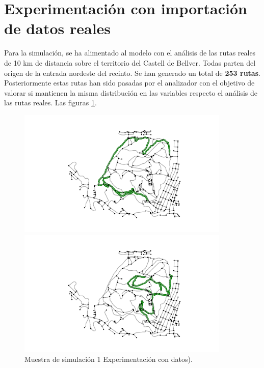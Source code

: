 \section{Experimentación con importación de datos reales}
Para la simulación, se ha alimentado al modelo con el análisis de las rutas reales de 10 
km de distancia sobre el territorio del Castell de Bellver. Todas parten del origen de la 
entrada nordeste del recinto. Se han generado un total de \textbf{253 rutas}. 
Posteriormente estas rutas han sido pasadas por el analizador con el objetivo de valorar 
si mantienen la misma distribución en las variables respecto el análisis de las rutas 
reales. Las figuras \ref{figure:SimulatedTrack1}.
\begin{figure}[!htb]
\centering
\begin{minipage}{0.70\textwidth}
\includegraphics[width=0.9\textwidth]{./Imagenes/SimulatedTrack1.png}
\caption{Muestra de simulación 1 Experimentación con datos).}
\label{figure:SimulatedTrack1}
\end{minipage}
\begin{minipage}{0.48\textwidth}
\includegraphics[width=0.9\textwidth]{./Imagenes/SimulatedTrack2.png}

\end{minipage}
\end{figure}
